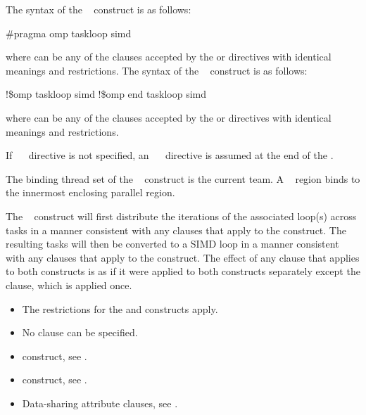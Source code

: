 \syntax
\ccppspecificstart
The syntax of the ~ construct is as follows:
\begin{boxedcode}
\#pragma omp taskloop simd 
\end{boxedcode}
where  can be any of the clauses accepted by the  or  directives with identical meanings and restrictions.
\ccppspecificend
\fortranspecificstart
The syntax of the ~ construct is as follows:
\begin{boxedcode}
!\$omp taskloop simd 
\plc{[}!\$omp end taskloop simd\plc{]}
\end{boxedcode}
where  can be any of the clauses accepted by the  or  directives with identical meanings and restrictions.

If ~~ directive is not specified, an ~~ directive is assumed at the end of the .
\fortranspecificend

\binding
The binding thread set of the ~ construct is the current team. A ~ region binds to the innermost enclosing parallel region.

\descr
The ~ construct will first distribute the iterations of the associated loop(s) across tasks in a manner consistent with any clauses that apply to the  construct. The resulting tasks will then be converted to a SIMD loop in a manner consistent with any clauses that apply to the  construct. The effect of any clause that applies to both constructs is as if it were applied to both constructs separately except the  clause, which is applied once.

\restrictions
\begin{itemize}
\item The restrictions for the  and  constructs apply.
\item No  clause can be specified. 
\end{itemize}

\crossreferences
\begin{itemize}
\item {} construct, see .
\item {} construct, see .
\item Data-sharing attribute clauses, see . 
\end{itemize}




